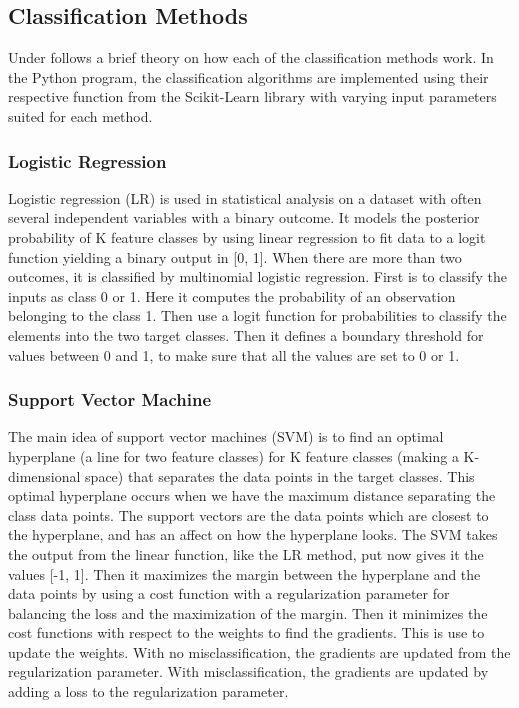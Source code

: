 \documentclass[12pt,a4paper,english]{article}
\begin{document}
\subsection{Classification Methods}
\label{subsect:class_methods}
Under follows a brief theory on how each of the classification methods work. In the Python program, the classification algorithms are implemented using their respective function from the Scikit-Learn library with varying input parameters suited for each method.

\subsubsection{Logistic Regression}
\label{subsubsect:LR}
Logistic regression (LR) is used in statistical analysis on a dataset with often several independent variables with a binary outcome. It models the posterior probability of K feature classes by using linear regression to fit data to a logit function yielding a binary output in [0, 1]. When there are more than two outcomes, it is classified by multinomial logistic regression. First is to classify the inputs as class 0 or 1. Here it computes the probability of an observation belonging to the class 1. Then use a logit function for probabilities to classify the elements into the two target classes. Then it defines a boundary threshold for values between 0 and 1, to make sure that all the values are set to 0 or 1. \cite{LR}

\subsubsection{Support Vector Machine}
\label{subsubsect:SVM}
The main idea of support vector machines (SVM) is to find an optimal hyperplane (a line for two feature classes) for K feature classes (making a K-dimensional space) that separates the data points in the target classes. This optimal hyperplane occurs when we have the maximum distance separating the class data points. The support vectors are the data points which are closest to the hyperplane, and has an affect on how the hyperplane looks. The SVM takes the output from the linear function, like the LR method, put now gives it the values [-1, 1]. Then it maximizes the margin between the hyperplane and the data points by using a cost function with a regularization parameter for balancing the loss and the maximization of the margin. Then it minimizes the cost functions with respect to the weights to find the gradients. This is use to update the weights. With no misclassification, the gradients are updated from the regularization parameter. With misclassification, the gradients are updated by adding a loss to the regularization parameter. \cite{SVM}
\end{document}
